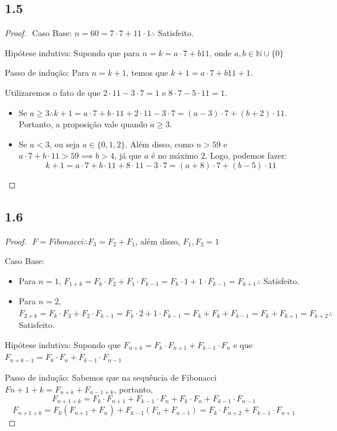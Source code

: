 \documentclass{article}
\begin{document}
\subsection*{1.5}
\begin{proof}
$ $\newline
Caso Base: $n = 60 = 7\cdot7 + 11\cdot1 \therefore$ Satisfeito. 

Hipótese indutiva: Supondo que para $n=k = a\cdot7 + b\dot11$, onde $a,b \in \mathbb{N}\cup\{0\}$

Passo de indução: Para $n = k+1$, temos que $k+1 =a\cdot7 + b\dot11 + 1$.

Utilizaremos o fato de que $2\cdot11-3\cdot7 = 1$ e $8\cdot7 - 5\cdot11 = 1$.

\begin{itemize}

\item Se $a \geq  3 \therefore k + 1 =a\cdot7+b\cdot11+2\cdot11-3\cdot7 = (a-3)\cdot7 + (b+2)\cdot11$. Portanto,
a proposição vale quando $a \geq 3 $.

\item Se $a<3$, ou seja $a \in \{0,1,2\}$. Além disso, como $n > 59$ e $a\cdot7 + b\cdot11 > 59 \implies b > 4$, já que $a$ é no máximo 2.
Logo, podemos fazer:
$$k+1 =a\cdot7+b\cdot11+8\cdot11-3\cdot7 = (a+8)\cdot7 + (b-5)\cdot11 $$

\end{itemize}
\end{proof}

\subsection*{1.6}
\begin{proof}
$ $\newline
$F = Fibonacci \therefore F_3 = F_2 + F_1$, além disso, $F_1,F_2 = 1$

Caso Base:
\begin{itemize}
\item Para $n=1$, $F_{1+k}=F_k\cdot F_2+F_1\cdot F_{k-1}=F_k\cdot1+1\cdot F_{k-1} = F_{k+1} \therefore$ Satisfeito.

\item Para $n=2$, $F_{2+k}=F_k\cdot F_3+F_2\cdot F_{k-1}=F_k\cdot2+1\cdot F_{k-1} = F_k + F_k + F_{k-1} = F_k + F_{k+1} =F_{k+2} \therefore$ Satisfeito.
\end{itemize}

Hipótese indutiva: Supondo que $F_{n+k} = F_k \cdot F_{n+1} + F_{k-1} \cdot F_n$ e que $F_{n+k-1} = F_k \cdot F_{n} + F_{k-1} \cdot F_{n-1}$

Passo de indução: Sabemos que na sequência de Fibonacci $F{n+1+k} = F_{n+k} + F_{n-1+k}$, portanto,
$$F_{n+1+k} = F_k \cdot F_{n+1} + F_{k-1} \cdot F_n + F_k \cdot F_{n} + F_{k-1} \cdot F_{n-1}$$
$$F_{n+1+k} = F_k(F_{n+1}+F_{n})+F_{k-1}(F_n + F_{n-1}) = F_k\cdot F_{n+2}+F_{k-1}\cdot F_{n+1}$$

\end{proof}
\end{document}
